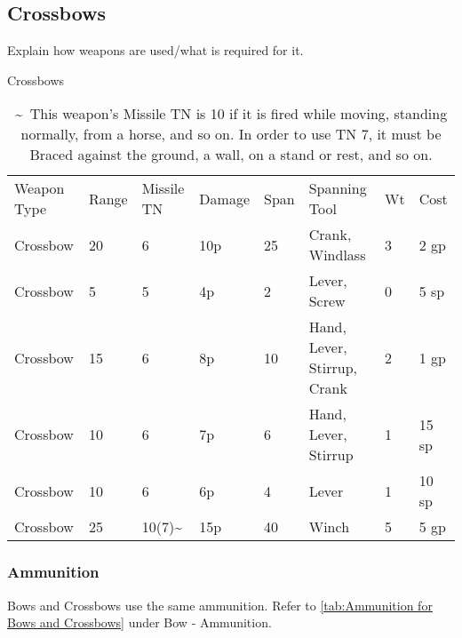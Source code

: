 \documentclass[oneside,11pt,english]{book}
\begin{document}
\subsection{Crossbows}
Explain how weapons are used/what is required for it. 
\begin{table} [!hb] %
	\centering
	\caption{Crossbows}
	\label{tab:Crossbows}
	\begin{tabu} to \linewidth { X X[-2,c]X[-2,c]X[-2,c]X[-2,c]  X[4] X[-2]X[-2]}
		Weapon Type & Range & Missile TN           & Damage & Span & Spanning Tool               & Wt & Cost  \\
		Crossbow    & 20    & 6                    & 10p    & 25   & Crank, Windlass             & 3  & 2 gp  \\
		Crossbow    & 5     & 5                    & 4p     & 2    & Lever, Screw                & 0  & 5 sp  \\
		Crossbow    & 15    & 6                    & 8p     & 10   & Hand, Lever, Stirrup, Crank & 2  & 1 gp  \\
		Crossbow    & 10    & 6                    & 7p     & 6    & Hand, Lever, Stirrup        & 1  & 15 sp \\
		Crossbow    & 10    & 6                    & 6p     & 4    & Lever                       & 1  & 10 sp \\
		Crossbow    & 25    & 10(7)\textasciitilde & 15p    & 40   & Winch                       & 5  & 5 gp
	\end{tabu}
\vspace{5pt}	\caption*{\textasciitilde~This weapon’s Missile TN is 10 if it is fired while moving, standing normally, from a horse, and so on. In order to use TN 7, it must be Braced against the ground, a wall, on a stand or rest, and so on.}
\end{table}
\subsubsection{Ammunition}
Bows and Crossbows use the same ammunition. Refer to \autoref{tab:Ammunition for Bows and Crossbows} under Bow - Ammunition. %
\end{document}

